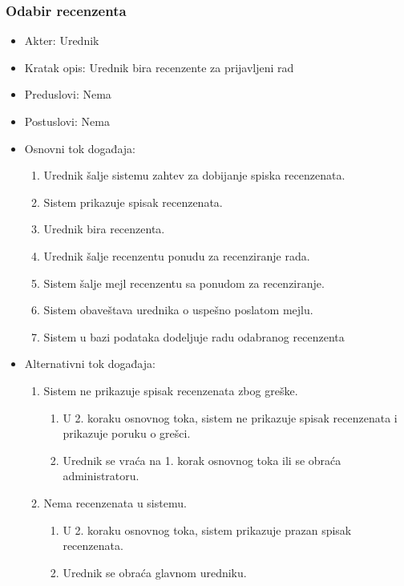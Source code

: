 \documentclass[a4paper]{article}
\begin{document}
\subsubsection{Odabir recenzenta}
\label{subsubsection:odabirrecenzenta}
\begin{itemize}
    \item Akter: Urednik
    \item Kratak opis: Urednik bira recenzente za prijavljeni rad
    \item Preduslovi: Nema
    \item Postuslovi: Nema
    \item Osnovni tok događaja:
        \begin{enumerate}
           \item Urednik šalje sistemu zahtev za dobijanje spiska recenzenata.
           \item Sistem prikazuje spisak recenzenata.
           \item Urednik bira recenzenta.
           \item Urednik šalje recenzentu ponudu za recenziranje rada.
           \item Sistem šalje mejl recenzentu sa ponudom za recenziranje.
           \item Sistem obaveštava urednika o uspešno poslatom mejlu. 
           \item Sistem u bazi podataka dodeljuje radu odabranog recenzenta
        \end{enumerate}
    \item Alternativni tok događaja:
        \begin{enumerate}
            \item Sistem ne prikazuje spisak recenzenata zbog greške.
            \begin{enumerate}
                \item U 2. koraku osnovnog toka, sistem ne prikazuje spisak recenzenata i prikazuje poruku o grešci.
                \item Urednik se vraća na 1. korak osnovnog toka ili se obraća administratoru.
            \end{enumerate}
            \item Nema recenzenata u sistemu.
            \begin{enumerate}
                \item U 2. koraku osnovnog toka, sistem prikazuje prazan spisak recenzenata.
                \item Urednik se obraća glavnom uredniku.

\end{enumerate}
\end{enumerate}
\end{itemize}
\end{document}
